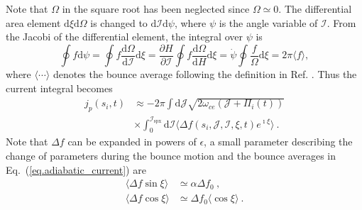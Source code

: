 Note that $\Omega$ in the square root has been  neglected since $\Omega \simeq 0$.
The differential area element $\mathrm{d}\xi\mathrm{d}\Omega$ is changed to $\mathrm{d}\mathcal{I}\mathrm{d}\psi$, where $\psi$ is the angle variable of $\mathcal{I}$.
From the Jacobi of the differential element, the integral over $\psi$ is
\begin{equation}
      \oint f \mathrm{d}\psi = \oint f \frac{\mathrm{d}\Omega}{\mathrm{d}\mathcal{I}}\mathrm{d}\xi = \frac{\partial H}{\partial \mathcal{I}} \oint f \frac{\mathrm{d}\Omega}{\mathrm{d} H}\mathrm{d}\xi = \dot{\psi}\oint \frac{f}{\Omega} \mathrm{d}\xi = 2 \pi \langle f \rangle,
\end{equation}
where $\langle\cdots\rangle$ denotes the bounce average following the definition in Ref. \cite{berk1999}.
Thus the current integral becomes
\begin{equation}\label{eq.adiabatic_current}
\begin{aligned}
    j_p(s_i,t)  &\approx -  {2\pi} \int\mathrm{d} \mathcal{J}  \sqrt{2\omega_{ce} (\mathcal{J} + \Pi_i(t))} \\
    & \times 
    \int_0^{\mathcal{I}_{\mathrm{s p x}}}\mathrm{d}\mathcal{I}  \langle \Delta f(s_i,\mathcal{J},\mathcal{I},\xi,t)e^{\imath \xi} \rangle  ~.
\end{aligned}
\end{equation}
Note that $\Delta f$ can be expanded in powers of $\epsilon$, a small parameter describing the change of parameters during the bounce motion
and the bounce averages in Eq.~(\ref{eq.adiabatic_current}) are 
 \cite{berk1999} 
\begin{equation}
    \begin{aligned}
    \langle\Delta f \sin \xi \rangle &\simeq \alpha \Delta f_0 ~, \\ 
    \langle \Delta f \cos \xi \rangle &\simeq  \Delta f_0 \langle \cos \xi \rangle ~.
    \end{aligned}
\end{equation}
